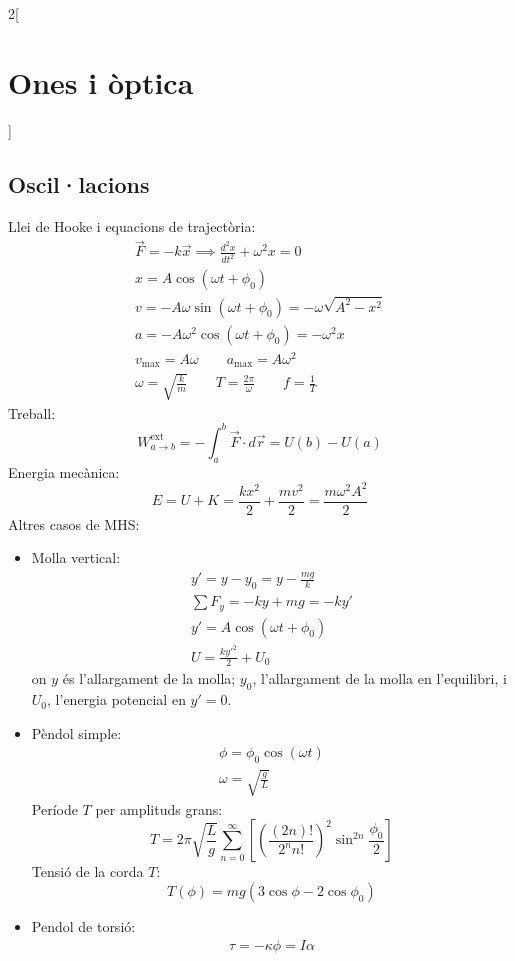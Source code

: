 \documentclass[../../../main.tex]{subfiles}
\begin{document}
\begin{multicols}{2}[\section{Ones i òptica}]
\subsection{Oscil·lacions}
Llei de Hooke i equacions de trajectòria:
\begin{gather*}
    \Vec{F}=-k\Vec{x}\implies\frac{d^2x}{dt^2}+\omega^2x=0\\
    x=A\cos(\omega t+\phi_0)\\
    v=-A\omega\sin(\omega t+\phi_0)=-\omega\sqrt{A^2-x^2}\\
    a=-A\omega^2\cos(\omega t+\phi_0)=-\omega^2x\\
    v_\text{max}=A\omega\qquad a_\text{max}=A\omega^2\\
    \omega=\sqrt{\frac{k}{m}}\qquad T=\frac{2\pi}{\omega}\qquad f=\frac{1}{T}
\end{gather*}
Treball: $$W_{a\to b}^\text{ext}=-\int_a^b\Vec{F}\cdot d\Vec{r}=U(b)-U(a)$$
Energia mecànica: $$E=U+K=\frac{kx^2}{2}+\frac{mv^2}{2}=\frac{m\omega^2A^2}{2}$$
Altres casos de MHS:
\begin{itemize}
    \item Molla vertical:
    \begin{gather*}
        y'=y-y_0=y-\frac{mg}{k}\\
        \sum F_y=-ky+mg=-ky'\\
        y'=A\cos(\omega t+\phi_0)\\
        U=\frac{ky'^2}{2}+U_0
    \end{gather*}
    {\footnotesize on $y$ és l'allargament de la molla; $y_0$, l'allargament de la molla en l'equilibri, i $U_0$, l'energia potencial en $y'=0$.}
    \item Pèndol simple:
    \begin{gather*}
        \phi=\phi_0\cos(\omega t)\\
        \omega=\sqrt{\frac{g}{L}}
    \end{gather*}
    Període $T$ per amplituds grans:
    $$T=2\pi\sqrt{\frac{L}{g}}\sum_{n=0}^\infty\left[\left(\frac{(2n)!}{2^nn!}\right)^2\sin^{2n}\frac{\phi_0}{2}\right]$$
    Tensió de la corda $T$: $$T(\phi)=mg(3\cos\phi-2\cos\phi_0)$$
    \item Pendol de torsió:
    \begin{gather*}
        \tau=-\kappa\phi=I\alpha\\

\end{gather*}
\end{itemize}
\end{multicols}
\end{document}
